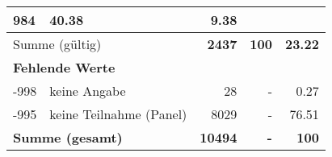 \begin{longtable}{lXrrr}
       \num{984} &
       \num[round-mode=places,round-precision=2]{40.38} &
         \num[round-mode=places,round-precision=2]{9.38} \\
     \midrule
     \multicolumn{2}{l}{Summe (gültig)} &
       \textbf{\num{2437}} &
     \textbf{\num{100}} &
       \textbf{\num[round-mode=places,round-precision=2]{23.22}} \\
     \multicolumn{5}{l}{\textbf{Fehlende Werte}}\\
       -998 &
       keine Angabe &
         \num{28} &
        - &
         \num[round-mode=places,round-precision=2]{0.27} \\
       -995 &
       keine Teilnahme (Panel) &
         \num{8029} &
        - &
         \num[round-mode=places,round-precision=2]{76.51} \\
     \midrule
     \multicolumn{2}{l}{\textbf{Summe (gesamt)}} &
          \textbf{\num{10494}} &
        \textbf{-} &
        \textbf{\num{100}} \\
     \bottomrule
     \end{longtable}
     
